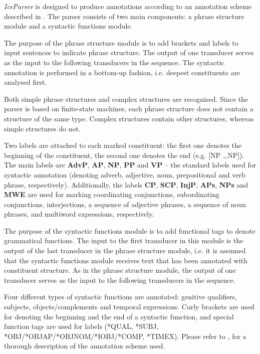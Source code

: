 \documentclass[11pt]{article}
\begin{document}
\emph{IceParser} is designed to produce annotations according to an annotation scheme described in \citep{lof06c}.
The parser consists of two main components: a phrase structure module and a syntactic functions module.

The purpose of the phrase structure module is to add brackets and labels to input sentences to indicate phrase structure.
The output of one transducer serves as the input to the following transducers in the sequence.
The syntactic annotation is performed in a bottom-up fashion, i.e. deepest constituents are analysed first.

Both simple phrase structures and complex structures are recognised.
Since the parser is based on finite-state machines, each phrase structure does not contain a structure of the same type.
Complex structures contain other structures, whereas simple structures do not.

Two labels are attached to each marked constituent: the first one denotes the beginning of the constituent, the second one denotes the end (e.g. [NP \ldots NP]).
The main labels are \textbf{AdvP}, \textbf{AP}, \textbf{NP}, \textbf{PP} and \textbf{VP} -- the standard labels used for syntactic annotation (denoting adverb, adjective, noun, prepositional and verb phrase, respectively).
Additionally, the labels \textbf{CP}, \textbf{SCP}, \textbf{InjP}, \textbf{APs}, \textbf{NPs} and \textbf{MWE} are used for marking coordinating conjunctions, subordinating conjunctions, interjections, a sequence of adjective phrases, a sequence of noun phrases, and multiword expressions, respectively.

The purpose of the syntactic functions module is to add functional tags to denote grammatical functions.
The input to the first transducer in this module is the output of the last transducer in the phrase structure module, i.e. it is assumed that the syntactic functions module receives text that has been annotated with constituent structure.
As in the phrase structure module, the output of one transducer serves as the input to the following transducers in the sequence.

Four different types of syntactic functions are annotated: genitive qualifiers, subjects, objects/complements and temporal expressions.
Curly brackets are used for denoting the beginning and the end of a syntactic function, and special function tags are used for labels (*QUAL, *SUBJ, *OBJ/*OBJAP/*OBJNOM/*IOBJ/*COMP, *TIMEX).
Please refer to \citep{lof06c}, for a thorough description of the annotation scheme used.
\end{document}
